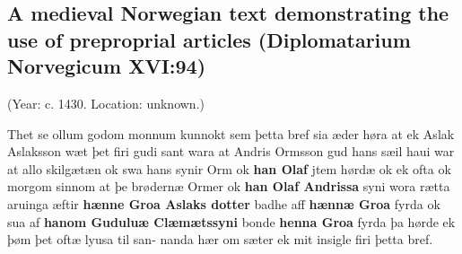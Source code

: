 \subsection[A medieval Norwegian text demonstrating the use of preproprial articles (Diplomatarium Norvegicum XVI:94)]{A medieval Norwegian text demonstrating the use of preproprial articles (Diplomatarium Norvegicum XVI:94)}
 (Year: c. 1430. Location: unknown.)


Thet se ollum godom monnum kunnokt sem þetta bref sia\newline
æder høra at ek Aslak Aslaksson wæt þet firi gudi sant wara\newline
at Andris Ormsson gud hans sæil haui war at allo skilgætæn ok\newline
swa hans synir Orm ok \textbf{han Olaf} jtem hørdæ ok ek ofta ok\newline
morgom sinnom at þe brødernæ Ormer ok \textbf{han Olaf Andrissa}\newline
syni wora rætta aruinga æftir \textbf{hænne Groa Aslaks dotter} badhe\newline
aff \textbf{hænnæ Groa} fyrda ok sua af \textbf{hanom Guduluæ Clæmætssyni}\newline
bonde \textbf{henna Groa} fyrda þa hørde ek þøm þet oftæ lyusa til san-\newline
nanda hær om sæter ek mit insigle firi þetta bref.

